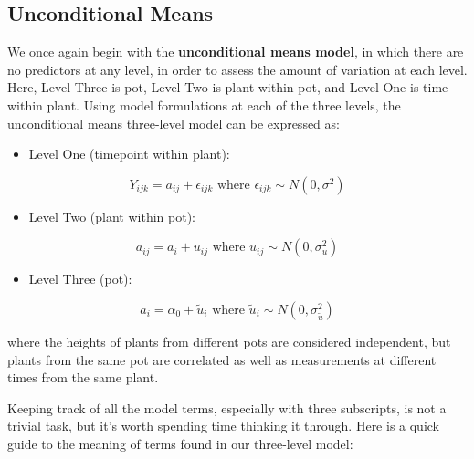 \documentclass[
]{krantz}
\providecommand{\tightlist}{%
  \setlength{\itemsep}{0pt}\setlength{\parskip}{0pt}}
\begin{document}
\subsection{Unconditional Means}\label{unconditional-means}

We once again begin with the \textbf{unconditional means model},  in which there are no predictors at any level, in order to assess the amount of variation at each level. Here, Level Three is pot, Level Two is plant within pot, and Level One is time within plant. Using model formulations at each of the three levels, the unconditional means three-level model can be expressed as:

\begin{itemize}
\tightlist
\item
  Level One (timepoint within plant):
\end{itemize}

\begin{equation*}
Y_{ijk} = a_{ij}+\epsilon_{ijk} \textrm{ where } \epsilon_{ijk}\sim N(0,\sigma^2)
\end{equation*}

\begin{itemize}
\tightlist
\item
  Level Two (plant within pot):
\end{itemize}

\begin{equation*}
a_{ij} = a_{i}+u_{ij} \textrm{ where } u_{ij}\sim N(0,\sigma_{u}^{2})
\end{equation*}

\begin{itemize}
\tightlist
\item
  Level Three (pot):
\end{itemize}

\begin{equation*}
a_{i} = \alpha_{0}+\tilde{u}_{i} \textrm{ where } \tilde{u}_{i} \sim N(0,\sigma_{\tilde{u}}^{2})
\end{equation*}

where the heights of plants from different pots are considered independent, but plants from the same pot are correlated as well as measurements at different times from the same plant.

Keeping track of all the model terms, especially with three subscripts, is not a trivial task, but it's worth spending time thinking it through. Here is a quick guide to the meaning of terms found in our three-level model:
\end{document}
